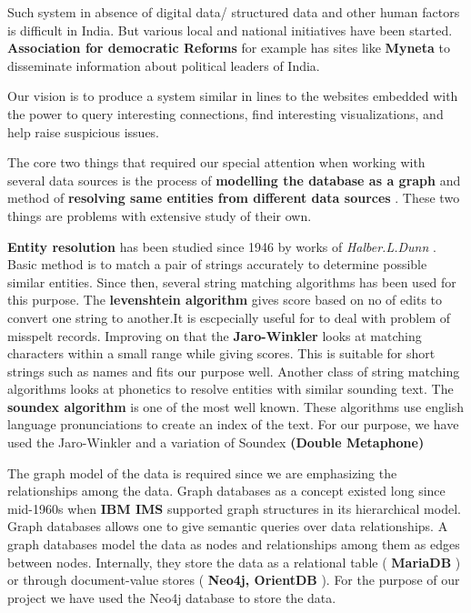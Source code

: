 Such system in absence of digital data/ structured data and other human factors is difficult in India. But various local and national initiatives have been started. \textbf{Association for democratic Reforms} \cite{ADR} for example has sites like \textbf{Myneta} \cite{MyNeta} to disseminate information about political leaders of India.	

Our vision is to produce a system similar in lines to the websites embedded with the power to query interesting connections, find interesting visualizations, and help raise suspicious issues.

The core two things that required our special attention when working with several data sources is the process of \textbf{ modelling the database as a graph } and method of \textbf{ resolving same entities from different data sources }. These two things are problems with extensive study of their own.

\textbf{ Entity resolution } has been studied since 1946 by works of \emph{ Halber.L.Dunn }\cite{dunn}. Basic method is to match a pair of strings accurately to determine possible similar entities. Since then, several string matching algorithms has been used for this purpose. The \textbf{ levenshtein algorithm } \cite{levenshtein} gives score based on no of edits to convert one string to another.It is escpecially useful for to deal with problem of misspelt records. Improving on that the \textbf{ Jaro-Winkler} \cite{jwinkler} looks at matching characters within a small range while giving scores. This is suitable for short strings such as names and fits our purpose well. Another class of string matching algorithms looks at phonetics to resolve entities with similar sounding text. The \textbf{ soundex algorithm }\cite{knuth} is one of the most well known. These algorithms use english language pronunciations to create an index of the text. For our purpose, we have used the Jaro-Winkler and a variation of Soundex \textbf{ (Double Metaphone) }\cite{philips}

    The graph model of the data is required since we are emphasizing the relationships among the data. Graph databases as a concept existed long since mid-1960s when \textbf{ IBM IMS } \cite{korth} \cite{ims} supported graph structures in its hierarchical model. Graph databases allows one to give semantic queries  over data relationships. A graph databases model the data as nodes and relationships among them as edges between nodes. Internally, they store the data as a relational table (\textbf{ MariaDB }\cite{maria}) or through document-value stores (\textbf{ Neo4j, OrientDB }\cite{neo}\cite{orient}). For the purpose of our project we have used the Neo4j database to store the data. 


